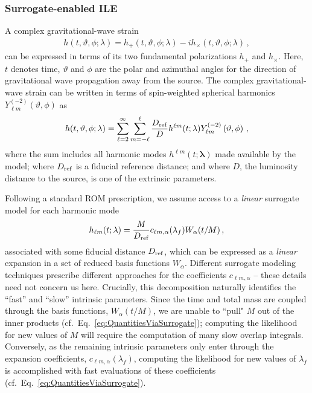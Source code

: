 \documentclass[aps,prd,nofootinbib,showpacs,amssymb,twocolumn]{revtex4}
\newcommand\Y[1]{Y^{(#1)}}
\begin{document}
\subsubsection{Surrogate-enabled ILE}

A complex gravitational-wave strain
%
%
%
%
%
\begin{align} \label{eq:strain}
h(t,\vartheta,\phi;\lambda) =  h_+(t,\vartheta,\phi;\lambda) - 
                                i h_\times (t,\vartheta,\phi;\lambda) \, ,
\end{align}
can be expressed in terms of its two fundamental polarizations $h_+$ and $h_\times$.
Here, $t$ denotes time, $\vartheta$ and $\phi$ are the polar and azimuthal angles
for the direction of gravitational wave propagation away from the source. 
The complex gravitational-wave strain can be written in terms of
spin-weighted spherical harmonics $\Y{-2}_{\ell m} \left(\vartheta, \phi \right)$ as 
\begin{align} \label{eq:strain_mode}
h(t,\vartheta,\phi;\lambda) = 
\sum_{\ell=2}^{\infty} \sum_{m=-\ell}^{\ell} \frac{D_{\rm ref}}{D} h^{\ell m}(t;\lambda) \Y{-2}_{\ell m} \left(\vartheta, \phi \right) \, ,
\end{align}
where the sum includes all harmonic modes $h^{\ell m}(t;\pmb{\lambda})$ made available by the model;  where
$D_{\rm ref}$ is a fiducial reference distance; and where $D$, the luminosity distance to the  source, is one of the
extrinsic parameters.  

Following a standard ROM prescription, we assume access to a {\em linear} surrogate model for 
each harmonic mode
\begin{eqnarray} \label{eq:linear_surrogate}
h_{\ell m}(t; \lambda) = \frac{M}{D_{\rm ref}} c_{\ell m, \alpha}(\lambda_f) W_\alpha(t/M) \,,
\end{eqnarray}
associated with some  fiducial distance $D_{\rm ref}$, which can be expressed as a {\em linear} expansion
in a set of reduced basis functions $W_\alpha$.
Different surrogate modeling techniques 
prescribe different approaches for the coefficients $c_{\ell m, \alpha}$ -- these details need not concern us
here. Crucially, this decomposition naturally identifies the ``fast'' and ``slow'' intrinsic parameters.
  Since the time and total mass are coupled through the basis functions, $W_\alpha(t/M)$, 
  we are unable to ``pull" $M$ out of the inner products (cf.~Eq.~\eqref{eq:QuantitiesViaSurrogate}); computing the 
  likelihood for new values of $M$ will require the computation of many slow overlap integrals. 
  Conversely, as the remaining intrinsic parameters only enter through the expansion
  coefficients, $c_{\ell m, \alpha}(\lambda_f)$, computing the likelihood for new values of 
  $\lambda_f$ is accomplished with fast evaluations of these coefficients (cf.~Eq.~\eqref{eq:QuantitiesViaSurrogate}).
%
%
%
%
%
%
\end{document}
